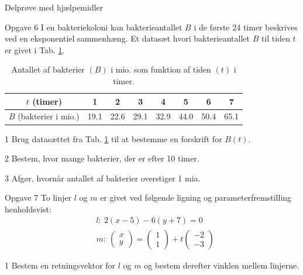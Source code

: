 \documentclass[12pt,x11names,a4paper]{article}
\begin{document}
\newpage
\begin{center}
\LARGE
Delprøve med hjælpemidler 
\end{center}

\begin{opgavetekst}{Opgave 6}
	I en bakteriekoloni kan bakterieantallet $B$ i de første 24 timer beskrives ved en eksponentiel sammenhæng. Et datasæt hvori bakterieantallet $B$ til tiden $t$ er givet i 
	Tab. \ref{tab:bakterie}.
	\begin{table}[H]
		\centering
		\begin{tabular}{c|c|c|c|c|c|c|c}
		$t$ (timer) &1 & 2 & 3 & 4 & 5 & 6 & 7 \\
		\hline
		$B$ (bakterier i mio.) & 19.1 & 22.6 & 29.1 & 32.9 & 44.0 & 50.4 & 65.1
		\end{tabular}
		\caption{Antallet af bakterier $(B)$ i mio. som funktion af tiden $(t)$ i timer. }
		\label{tab:bakterie}
	\end{table}\phantom{h}
\end{opgavetekst}
\begin{delopgave}{}{1}
	Brug datasættet fra Tab. \ref{tab:bakterie} til at bestemme en forskrift for $B(t)$.
\end{delopgave}
\begin{delopgave}{}{2}
	Bestem, hvor mange bakterier, der er efter 10 timer. 
\end{delopgave}
\begin{delopgave}{}{3}
	Afgør, hvornår antallet af bakterier overstiger 1 mia.
\end{delopgave}
\begin{opgavetekst}{Opgave 7}
	To linjer $l$ og $m$ er givet ved følgende ligning og parameterfremstilling henholdsvist:
	\begin{align*}
		&l: \ 2(x-5)-6(y+7) = 0 \\
		&m: \ 
		\begin{pmatrix}
			x \\ y
		\end{pmatrix}=
		\begin{pmatrix}
			1 \\ 1
		\end{pmatrix} + t
		\begin{pmatrix}
			-2 \\ -3
		\end{pmatrix}
	\end{align*}
\end{opgavetekst}
\begin{delopgave}{}{1}
	Bestem en retningsvektor for $l$ og $m$ og bestem derefter vinklen mellem linjerne. 
\end{delopgave}
\end{document}
